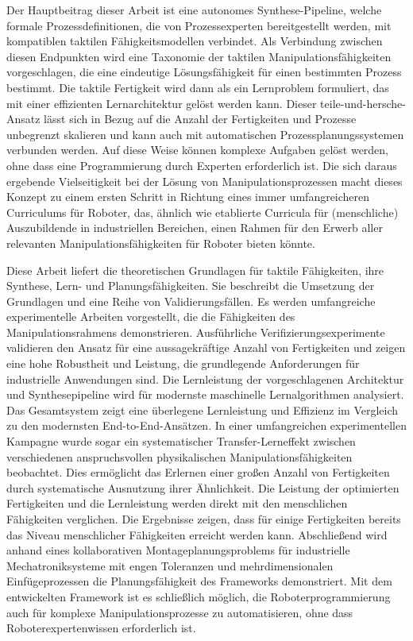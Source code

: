 Der Hauptbeitrag dieser Arbeit ist eine autonomes Synthese-Pipeline, welche formale Prozessdefinitionen, die von Prozessexperten bereitgestellt werden, mit kompatiblen taktilen F\"ahigkeitsmodellen verbindet.
Als Verbindung zwischen diesen Endpunkten wird eine Taxonomie der taktilen Manipulationsf\"ahigkeiten vorgeschlagen, die eine eindeutige L\"osungsf\"ahigkeit f\"ur einen bestimmten Prozess bestimmt.
Die taktile Fertigkeit wird dann als ein Lernproblem formuliert, das mit einer effizienten Lernarchitektur gel\"ost werden kann.
Dieser teile-und-hersche-Ansatz l\"asst sich in Bezug auf die Anzahl der Fertigkeiten und Prozesse unbegrenzt skalieren und kann auch mit automatischen Prozessplanungssystemen verbunden werden. Auf diese Weise k\"onnen komplexe Aufgaben gel\"ost werden, ohne dass eine Programmierung durch Experten erforderlich ist.
Die sich daraus ergebende Vielseitigkeit bei der L\"osung von Manipulationsprozessen macht dieses Konzept zu einem ersten Schritt in Richtung eines immer umfangreicheren Curriculums f\"ur Roboter, das, \"ahnlich wie etablierte Curricula f\"ur (menschliche) Auszubildende in industriellen Bereichen, einen Rahmen f\"ur den Erwerb aller relevanten Manipulationsf\"ahigkeiten f\"ur Roboter bieten k\"onnte.

Diese Arbeit liefert die theoretischen Grundlagen f\"ur taktile F\"ahigkeiten, ihre Synthese, Lern- und Planungsf\"ahigkeiten.
Sie beschreibt die Umsetzung der Grundlagen und eine Reihe von Validierungsf\"allen.
Es werden umfangreiche experimentelle Arbeiten vorgestellt, die die F\"ahigkeiten des Manipulationsrahmens demonstrieren.
Ausf\"uhrliche Verifizierungsexperimente validieren den Ansatz f\"ur eine aussagekr\"aftige Anzahl von Fertigkeiten und zeigen eine hohe Robustheit und Leistung, die grundlegende Anforderungen f\"ur industrielle Anwendungen sind.
Die Lernleistung der vorgeschlagenen Architektur und Synthesepipeline wird f\"ur modernste maschinelle Lernalgorithmen analysiert.
Das Gesamtsystem zeigt eine \"uberlegene Lernleistung und Effizienz im Vergleich zu den modernsten End-to-End-Ans\"atzen.
In einer umfangreichen experimentellen Kampagne wurde sogar ein systematischer Transfer-Lerneffekt zwischen verschiedenen anspruchsvollen physikalischen Manipulationsf\"ahigkeiten beobachtet. Dies erm\"oglicht das Erlernen einer gro{\ss}en Anzahl von Fertigkeiten durch systematische Ausnutzung ihrer \"Ahnlichkeit.
Die Leistung der optimierten Fertigkeiten und die Lernleistung werden direkt mit den menschlichen F\"ahigkeiten verglichen.
Die Ergebnisse zeigen, dass f\"ur einige Fertigkeiten bereits das Niveau menschlicher F\"ahigkeiten erreicht werden kann.
Abschlie{\ss}end wird anhand eines kollaborativen Montageplanungsproblems f\"ur industrielle Mechatroniksysteme mit engen Toleranzen und mehrdimensionalen Einf\"ugeprozessen die Planungsf\"ahigkeit des Frameworks demonstriert.
Mit dem entwickelten Framework ist es schlie{\ss}lich m\"oglich, die Roboterprogrammierung auch f\"ur komplexe Manipulationsprozesse zu automatisieren, ohne dass Roboterexpertenwissen erforderlich ist.

